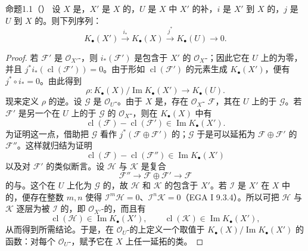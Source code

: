 \begin{SGAresult}{命题}{1.1（）}
设 $X$ 是，$X'$ 是 $X$ 的，$U$ 是 $X$ 中 $X'$ 的补，$i$ 是 $X'$ 到 $X$ 的，$j$ 是 $U$ 到 $X$ 的。则下列序列：
\[
K_\bullet(X')\xrightarrow{i_*}K_\bullet(X)\xrightarrow{j^*}K_\bullet(U)\longrightarrow0.
\]
\end{SGAresult}
\begin{proof}
若 $\mathcal F'$ 是 $\mathcal O_{X'}$-，则 $i_*(\mathcal F')$ 是包含于 $X'$ 的 $\mathcal O_X$-；因此它在 $U$ 上的为零，并且 $j^*i_*(\operatorname{cl}(\mathcal F'))=0$。由于形如 $\operatorname{cl}(\mathcal F')$ 的元素生成 $K_\bullet(X')$，便有 $j^*\circ i_*=0$。由此得到
\[
\rho:K_\bullet(X)/\operatorname{Im}K_\bullet(X')\longrightarrow K_\bullet(U).
\]
现来定义 $\rho$ 的逆。设 $\mathcal G$ 是 $\mathcal O_U$-。由于 $X$ 是，存在 $\mathcal O_X$- $\mathcal F$，其在 $U$ 上的于 $\mathcal G$。若 $\mathcal F'$ 是另一个在 $U$ 上的于 $\mathcal G$ 的 $\mathcal O_X$-，则在 $K_\bullet(X)$ 中有
\[
\operatorname{cl}(\mathcal F)-\operatorname{cl}(\mathcal F')\in\operatorname{Im}K_\bullet(X').
\]
为证明这一点，借助把 $\mathcal G$ 看作 $j^*(\mathcal F\oplus\mathcal F')$ 的；$\mathcal G$ 于是可以延拓为 $\mathcal F\oplus\mathcal F'$ 的 $\mathcal F''$。这样就归结为证明
\[
\operatorname{cl}(\mathcal F)-\operatorname{cl}(\mathcal F'')\in\operatorname{Im}K_\bullet(X')
\]
以及对 $\mathcal F'$ 的类似断言。设 $\mathcal H$ 与 $\mathcal K$ 是复合
\[
\mathcal F''\longrightarrow\mathcal F\oplus\mathcal F'\longrightarrow\mathcal F
\]
的与。这个在 $U$ 上化为 $\mathcal G$ 的，故 $\mathcal H$ 和 $\mathcal K$ 的包含于 $X'$。若 $\mathcal I$ 是 $X'$ 在 $X$ 中的，便存在整数 $m,n$ 使得 $\mathcal I^m\mathcal H=0$、$\mathcal I^n\mathcal K=0$（EGA I 9.3.4）。所以可把 $\mathcal H$ 与 $\mathcal K$ 逐层为被 $\mathcal I$ 的，即 $\mathcal O_{X'}$-的，而且有
\[
\operatorname{cl}(\mathcal H)\in\operatorname{Im}K_\bullet(X'),\qquad
\operatorname{cl}(\mathcal K)\in\operatorname{Im}K_\bullet(X'),
\]
从而得到所需结论。于是，在 $\mathcal O_U$-的上定义一个取值于 $K_\bullet(X)/\operatorname{Im}K_\bullet(X')$ 的函数：对每个 $\mathcal O_U$-，赋予它在 $X$ 上任一延拓的类。


\end{proof}
